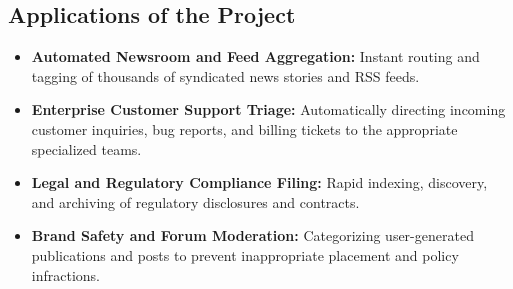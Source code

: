 \documentclass[12pt, a4paper]{article}
\begin{document}
\subsection{Applications of the Project}
\begin{itemize}
    \item \textbf{Automated Newsroom and Feed Aggregation:} Instant routing and tagging of thousands of syndicated news stories and RSS feeds.
    \item \textbf{Enterprise Customer Support Triage:} Automatically directing incoming customer inquiries, bug reports, and billing tickets to the appropriate specialized teams.
    \item \textbf{Legal and Regulatory Compliance Filing:} Rapid indexing, discovery, and archiving of regulatory disclosures and contracts.
    \item \textbf{Brand Safety and Forum Moderation:} Categorizing user-generated publications and posts to prevent inappropriate placement and policy infractions.
\end{itemize}

\newpage

\end{document}
